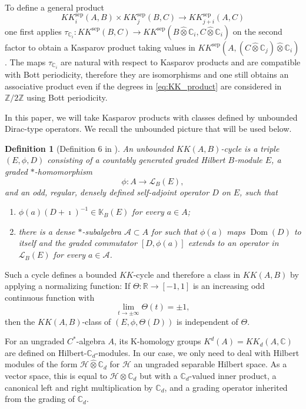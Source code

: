 \documentclass[12pt]{amsart}
\newtheorem{definition}[theorem]{Definition}
\newcommand{\CM}{{\mathbb C}}
\newcommand{\RM}{{\mathbb R}}
\newcommand{\ZM}{{\mathbb Z}}
\newcommand{\KM}{{\mathbb K}}
\newcommand{\Ll}{{\mathcal L}}
\newcommand{\Hh}{{\mathcal H}}
\DeclareMathOperator*{\Dom}{Dom}
\begin{document}
To define a general product
\begin{equation}
\label{eq:KK_product}
KK^{\mathrm{sep}}_i(A,B) \times KK_j^{\mathrm{sep}}(B,C) \to KK^{\mathrm{sep}}_{j+i}(A,C)
\end{equation}
one first applies $\tau_{\CM_i}: KK^{\mathrm{sep}}(B,C)\to KK^{\mathrm{sep}}(B\hat{\otimes} \CM_i, C\hat{\otimes} \CM_i)$ on the second factor to obtain a Kasparov product taking values in $KK^{\mathrm{sep}}(A, (C\hat{\otimes}\CM_j)\hat{\otimes}\CM_i)$. The maps $\tau_{\CM_i}$ are natural with respect to Kasparov products and are compatible with Bott periodicity, 
therefore they are isomorphisms and one still obtains an associative product even if the degrees in \eqref{eq:KK_product} are considered in $\ZM/2\ZM$ using Bott periodicity.

In this paper, we will take Kasparov products with classes defined by unbounded Dirac-type operators. We recall the unbounded picture that will be used below.

\begin{definition}[Definition 6 in \cite{Kucerovsky}]
\label{def:unbddkk}
An unbounded $KK(A,B)$-cycle is a triple $(E,\phi,D)$ consisting of a
countably generated graded Hilbert $B$-module $E$, a graded
$*$-homomorphism
\[\phi:A\longrightarrow\Ll_B(E),\]
and an odd, regular, densely defined self-adjoint operator $D$ on $E$,
such that
\begin{enumerate}
\item[(i)]
$\phi(a)(D+\imath)^{-1}\in\KM_B(E)$ for every $a\in A$;
\item[(ii)]
there is a dense $*$-subalgebra $\mathcal{A} \subset A$ for such that $\phi(a)$ maps $\Dom(D)$ to itself and the graded commutator $[D,\phi(a)]$ extends to an operator in
$\Ll_B(E)$ for every $a\in\mathcal{A}$.
\end{enumerate}
\end{definition}

Such a cycle defines a bounded $KK$-cycle and therefore a class in $KK(A,B)$ by applying a normalizing function: If $\Theta:\RM\to[-1,1]$ is an increasing odd continuous function with
\[\lim_{t \to \pm \infty} \Theta(t)=\pm 1,\]
then the $KK(A,B)$-class of $(E,\phi,\Theta(D))$ is independent of $\Theta$. 

For an ungraded $C^*$-algebra $A$, its K-homology groups $K^d(A)=KK_d(A, \CM)$  are defined on Hilbert-$\CM_d$-modules. In our case, we only need to deal with Hilbert modules of the form $\Hh\hat{\otimes}\CM_d$ for $\Hh$ an ungraded separable Hilbert space. 
As a vector space, this is equal to $\Hh\otimes \CM_d$ but with a $\CM_d$-valued inner product, a canonical left and right multiplication by $\CM_d$, and a grading operator inherited from the grading of $\CM_d$. 
\end{document}
